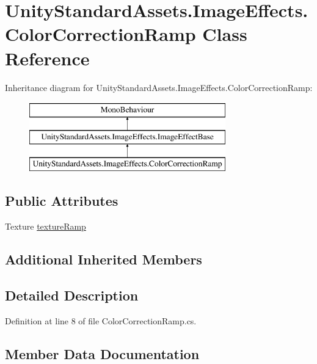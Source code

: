 \hypertarget{class_unity_standard_assets_1_1_image_effects_1_1_color_correction_ramp}{}\section{Unity\+Standard\+Assets.\+Image\+Effects.\+Color\+Correction\+Ramp Class Reference}
\label{class_unity_standard_assets_1_1_image_effects_1_1_color_correction_ramp}
Inheritance diagram for Unity\+Standard\+Assets.\+Image\+Effects.\+Color\+Correction\+Ramp\+:\begin{figure}[H]
\begin{center}
\leavevmode
\includegraphics[height=3.000000cm]{class_unity_standard_assets_1_1_image_effects_1_1_color_correction_ramp}
\end{center}
\end{figure}
\subsection*{Public Attributes}
\begin{DoxyCompactItemize}
\item 
Texture \mbox{\hyperlink{class_unity_standard_assets_1_1_image_effects_1_1_color_correction_ramp_abaa9ce0104edfaafeea9614c908b76cc}{texture\+Ramp}}
\end{DoxyCompactItemize}
\subsection*{Additional Inherited Members}


\subsection{Detailed Description}


Definition at line 8 of file Color\+Correction\+Ramp.\+cs.



\subsection{Member Data Documentation}
\mbox{\label{class_unity_standard_assets_1_1_image_effects_1_1_color_correction_ramp_abaa9ce0104edfaafeea9614c908b76cc}} 
